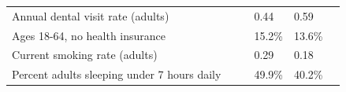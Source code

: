 \documentclass[9pt]{report}
\begin{document}
\begin{tabular}{p{.10in}p{.10in}p{.10in}p{3.7in}>{\hfill}p{.85in}>{\hfill}p{.85in}>{\hfill}p{.85in}>{\hfill}p{.85in}p{0.1in}}
\multicolumn{4}{l}{\parbox{3.6in}{\strut\raggedright{{Annual dental visit rate (adults)}}\strut}} &  &  & 0.44 & 0.59 & \multicolumn{1}{l}{}  \\ 
\multicolumn{4}{l}{\parbox{3.6in}{\strut\raggedright{{Ages 18-64, no health insurance}}\strut}} &  &  & 15.2\% & 13.6\% & \multicolumn{1}{l}{}  \\ 
\multicolumn{4}{l}{\parbox{3.6in}{\strut\raggedright{{Current smoking rate (adults)}}\strut}} &  &  & 0.29 & 0.18 & \multicolumn{1}{l}{}  \\ 
\multicolumn{4}{l}{\parbox{3.6in}{\strut\raggedright{{Percent adults sleeping under 7 hours daily}}\strut}} &  &  & 49.9\% & 40.2\% & \multicolumn{1}{l}{}  \\ 

\end{tabular}
\setlength{\tabcolsep}{6pt} %


\vspace{36pt}
\linespread{1.5}
\theendnotes
\end{document}
